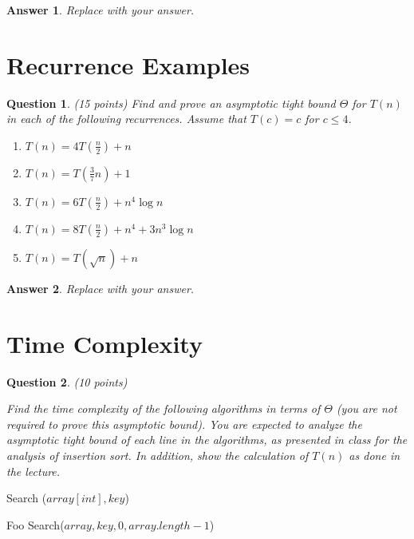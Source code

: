 \documentclass[a4paper]{article}
\theoremstyle{remarksStyle}
\theoremstyle{questionStyle}
\newtheorem{question}{Question}
\theoremstyle{answerStyle}
\newtheorem{answer}{Answer}
\begin{document}
\begin{answer}
    Replace with your answer.
\end{answer}

\newpage

\section {Recurrence Examples}
\begin{question} (15 points)
Find and prove an asymptotic tight bound $\Theta$ for $T(n)$ in each of the following recurrences. Assume that $T(c) = c$ for $c \le 4$.
\begin{enumerate}
    \item $T(n) = 4T(\frac{n}{2}) + n$
    \item $T(n) = T(\frac{3}{7}n) + 1$
    \item $T(n) = 6T(\frac{n}{2}) + n^4 \log{n}$
    \item $T(n) = 8T(\frac{n}{2}) + n^4 + 3n^3  \log{n} $
    \item $T(n) = T(\sqrt{n}) + n $
    
\end{enumerate}
\end{question}

\begin{answer}
    Replace with your answer.
\end{answer}

\vspace{2cm}

\section{Time Complexity}
\begin{question} (10 points)
    
Find the time complexity of the following algorithms in terms of $\Theta$ (you are not required to prove this asymptotic bound).
You are expected to analyze the asymptotic tight bound of each line in the algorithms, as presented in class for the analysis of insertion sort. 
In addition, show the calculation of $T(n)$ as done in the lecture.
\end{question}


\begin{algorithm}[H]\caption{Search ($array[int], key$)}
 \begin{algorithmic}[1]
  \RETURN   Foo Search($array, key, 0, array.length -1$) 
  \end{algorithmic} 
\end{algorithm} 
\end{document}
